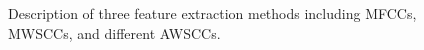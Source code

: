 \begin{figure}[htb!] %
\caption{Description of three feature extraction methods including MFCCs, MWSCCs, and different AWSCCs.}
\label{fig:featureExtraction} 
\end{figure}


